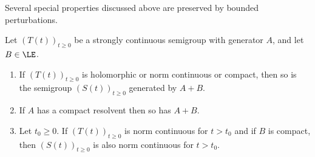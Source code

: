 Several special properties discussed above are preserved by bounded perturbations.
\begin{theorem} \label{thm:a2-1.30}
Let $(T(t))_{t \geq 0}$ be a strongly continuous semigroup with generator $A$, and let $B \in \LE$.
\begin{enumerate}[\upshape(i)]
\item
If\/ $(T(t))_{t \geq 0}$ is holomorphic or norm continuous or compact, then so is the semigroup 
$(S(t))_{t \geq 0}$ 
generated by $A+B$.

\item
If\/ $A$ has a compact resolvent then so has $A+B$.

\item
Let $t_{0} \geq 0$.
If\/ $(T(t))_{t \geq 0}$ is norm continuous for $t > t_{0}$ and if 
$B$ is compact, then $(S(t))_{t \geq 0}$ is also norm continuous for $t > t_{0}$.

\end{enumerate}
\end{theorem}
